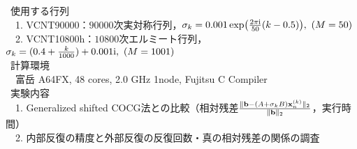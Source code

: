 

\textcolor{structure.fg}{\textbullet} \ 使用する行列\\
	　1. VCNT90000：$90000$次実対称行列，$\sigma_k = 0.001 \exp(\frac{2 \pi \i}{50}(k-0.5)),\ (M=50)$\\
	　2. VCNT10800h：$10800$次エルミート行列，$\sigma_k =(0.4+\frac{k}{1000}) + 0.001\i,\ (M=1001)$\\
\textcolor{structure.fg}{\textbullet} \ 計算環境\\
	　富岳 A64FX, 48 cores, 2.0 GHz 1node, Fujitsu C Compiler\\
\textcolor{structure.fg}{\textbullet} \ 実験内容\\
	　1. Generalized shifted COCG法との比較（相対残差$\frac{\|\vb{b}-(A+\sigma_{k}B)\vb{x}_{n}^{(k)}\|_2}{\|\vb{b}\|_2}$，実行時間）\\
	　2. 内部反復の精度と外部反復の反復回数・真の相対残差の関係の調査


%
%


\begin{comment}

\begin{itemize}
	\item 使用する行列\\
		1. VCNT90000：$90000$次実対称行列\\
		2. VCNT10800h：$10800$次エルミート行列
	\item 計算環境\\
		富岳 A64FX, 48 cores, 2.0 GHz 1node, Fujitsu C Compiler
	\item 実験内容\\
		1. Generalized shifted COCG法との比較（相対残差$\frac{\|\vb{b}-(A+\sigma_{k}B)\vb{x}_{n}^{(k)}\|_2}{\|\vb{b}\|_2}$，実行時間）\\
		2. 内部反復の精度と外部反復の反復回数・真の相対残差の関係の調査
\end{itemize}

\end{comment}

